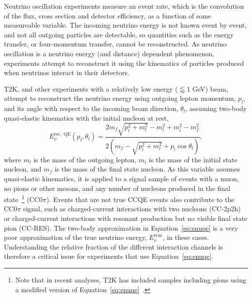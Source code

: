 Neutrino oscillation experiments measure an event rate, which is the convolution of the flux, cross section and detector efficiency, as a function of some measureable variable. The incoming neutrino energy is not known event by event, and not all outgoing particles are detectable, so quantities such as the energy transfer, or four-momentum transfer, cannot be reconstructed. As neutrino oscillation is a neutrino energy (and distance) dependent phenomenon, experiments attempt to reconstruct it using the kinematics of particles produced when neutrinos interact in their detectors.

T2K, and other experiments with a relatively low energy ($\lessapprox1$ GeV) beam, attempt to reconstruct the neutrino energy using outgoing lepton momentum, $p_{l}$, and its angle with respect to the incoming beam direction, $\theta_{l}$, assuming two-body quasi-elastic kinematics with the initial nucleon at rest,
\begin{equation}
E^{\mathrm{rec,\;QE}}_{\nu}\left(p_{l}, \theta_{l}\right) = \frac{2m_f\sqrt{p_{l}^2 + m^2_l} - m_l^2 + m_i^2-m_f^{2}}{2\left(m_f-\sqrt{p_{l}^2 + m^2_l}+p_l \cos\theta_l\right)},
\label{eq:enuqe}
\end{equation}
\noindent where $m_l$ is the mass of the outgoing lepton, $m_{i}$ is the mass of the initial state nucleon, and $m_{f}$ is the mass of the final state nucleon. As this variable assumes quasi-elastic kinematics, it is applied to a signal sample of events with a muon, no pions or other mesons, and any number of nucleons produced in the final state~\footnote{Note that in recent analyses, T2K has included samples including pions using a modified version of Equation~\ref{eq:enuqe}~\addcite.} (CC0$\pi$). Events that are not true CCQE events also contribute to the CC0$\pi$ signal, such as charged-current interactions with two nucleons (CC-2p2h) or charged-current interactions with resonant production but no visible final state pion (CC-RES). The two-body approximation in Equation~\ref{eq:enuqe} is a very poor approximation of the true neutrino energy, $E_{\nu}^{\mathrm{true}}$, in these cases. Understanding the relative fraction of the different interaction channels is therefore a critical issue for experiments that use Equation~\ref{eq:enuqe}.

